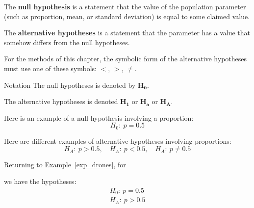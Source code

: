 \documentclass{beamer}
\newcommand{\nullhypothesis}[1]{H_0:~{#1}}
\newcommand{\althypothesis}[1]{H_A:~{#1}}
\begin{document}
\begin{frame}
\begin{definition}
The \textbf{null hypothesis} is a statement that the value of the population parameter (such as proportion, mean, or standard deviation) is equal to some claimed value.
\end{definition}\pause

\begin{definition}
The \textbf{alternative hypotheses} is a statement that the parameter has a value that somehow differs from the null hypotheses. 
\end{definition}\pause

\begin{note}
For the methods of this chapter, the symbolic form of the alternative hypotheses must use one of these symbols: $<$, $>$, $\neq$.
\end{note}\pause

\begin{block}{Notation}
The null hypotheses is denoted by $\boldsymbol{H_0}$.

\vspace{2mm}
The alternative hypotheses is denoted $\boldsymbol{H_1}$ or $\boldsymbol{H_a}$ or $\boldsymbol{H_A}$.
\end{block}
\end{frame}

\begin{frame}
\begin{example}
Here is an example of a null hypothesis involving a proportion:
\begin{equation*}
\nullhypothesis{p=0.5}
\end{equation*}
\end{example}\pause

\begin{example}
Here are different examples of alternative hypotheses involving proportions:
\begin{equation*}
\althypothesis{p>0.5},\quad
\althypothesis{p<0.5},\quad
\althypothesis{p\neq0.5}
\end{equation*}
\end{example}\pause

\begin{example}
Returning to Example~\ref{exp_drones}, for
\begin{center}
\end{center}
we have the hypotheses:
\begin{equation*}
\begin{aligned}
\nullhypothesis{p=0.5}\\
\althypothesis{p>0.5}
\end{aligned}
\end{equation*}
\end{example}
\end{frame}
\end{document}
